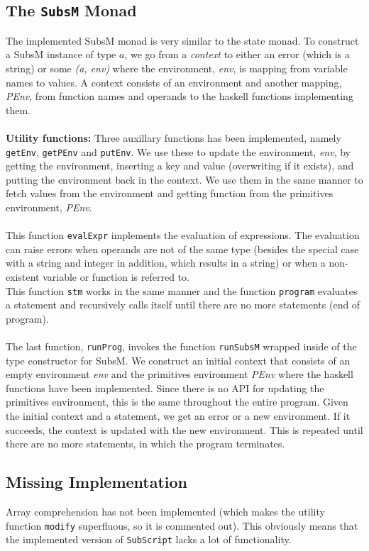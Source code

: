 \documentclass[a4paper]{article}
\begin{document}
\subsection{The \texttt{SubsM} Monad}
The implemented SubsM monad is very similar to the state monad. To construct a SubsM instance of type $a$, we go from a \textit{context} to either an error (which is a string) or some \textit{(a, env)} where the environment, \textit{env}, is mapping from variable names to values. A context consists of an environment and another mapping, \textit{PEnv}, from function names and operands to the haskell functions implementing them. \\
\\
\textbf{Utility functions:}
Three auxillary functions has been implemented, namely \texttt{getEnv}, \texttt{getPEnv} and \texttt{putEnv}. We use these to update the environment, \textit{env}, by getting the environment, inserting a key and value (overwriting if it exists), and putting the environment back in the context. We use them in the same manner to fetch values from the environment and getting function from the primitives environment, \textit{PEnv}. \\
\\
This function \texttt{evalExpr} implements the evaluation of expressions. The evaluation can raise errors when operands are not of the same type (besides the special case with a string and integer in addition, which results in a string) or when a non-existent variable or function is referred to. \\
This function \texttt{stm} works in the same manner and the function \texttt{program} evaluates a statement and recursively calls itself until there are no more statements (end of program). \\
\\
The last function, \texttt{runProg}, invokes the function \texttt{runSubsM} wrapped inside of the type constructor for SubsM. We construct an initial context that consists of an empty environment \textit{env} and the primitives environment \textit{PEnv} where the haskell functions have been implemented. Since there is no API for updating the primitives environment, this is the same throughout the entire program. Given the initial context and a statement, we get an error or a new environment. If it succeeds, the context is updated with the new environment. This is repeated until there are no more statements, in which the program terminates.

\subsection{Missing Implementation}
Array comprehension has not been implemented (which makes the utility function \texttt{modify} superfluous, so it is commented out). This obviously means that the implemented version of \texttt{SubScript} lacks a lot of functionality.
\end{document}
